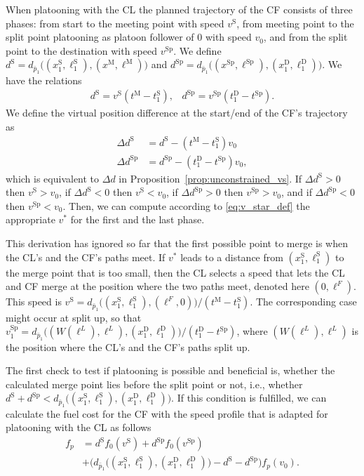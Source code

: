 \documentclass[letterpaper,10pt,conference,twocolumn]{IEEEtran}
\newcommand{\op}[1]{\mathrm{#1}}
\theoremstyle{definition}
\begin{document}
When platooning with the CL the planned trajectory of the CF consists of three phases: from start to the meeting point with speed $v^\op{S}$, from meeting point to the split point platooning as platoon follower of $0$ with speed $v_{0}$, and from the split point to the destination with speed $v^\op{Sp}$. We define $d^\op{S} = d_{\bar{p}_1}\big((x_1^\op{S},\ell_1^\op{S}),(x^\op{M},\ell^\op{M})\big)$ and $d^\op{Sp} = d_{\bar{p}_1}\big((x^\op{Sp},\ell^\op{Sp}),(x_1^\op{D},\ell_1^\op{D})\big)$. We have the relations
\begin{align*}
 d^\op{S} = v^\op{S}(t^\op{M} - t_1^\op{S}),\;\;\;
 d^\op{Sp} = v^\op{Sp}(t_1^\op{D} - t^\op{Sp}).
\end{align*}
We define the virtual position difference at the start/end of the CF's trajectory as
\begin{equation}
\begin{split}
 \Delta d^\op{S} &= d^\op{S} - (t^\op{M} - t_{1}^\op{S})v_{0}\\
 \Delta d^\op{Sp} &= d^\op{Sp} - (t_{1}^\op{D} - t^\op{Sp})v_{0}, \label{eq:delta_d_general}
\end{split}
\end{equation}
which is equivalent to $\Delta d$ in Proposition~\ref{prop:unconstrained_vs}. If $\Delta d^\op{S} > 0$ then $v^\op{S} > v_{0}$, if $\Delta d^\op{S} < 0$ then $v^\op{S} < v_{0}$, if $\Delta d^\op{Sp} > 0$ then $v^\op{Sp} > v_{0}$, and if $\Delta d^\op{Sp} < 0$ then $v^\op{Sp} < v_{0}$. Then, we can compute according to \eqref{eq:v_star_def} the appropriate $v^*$ for the first and the last phase. 

This derivation has ignored so far that the first possible point to merge is when the CL's and the CF's paths meet. If $v^*$ leads to a distance from $(x_1^\op{S},\ell_1^\op{S})$ to the merge point that is too small, then the CL selects a speed that lets the CL and CF merge at the position where the two paths meet, denoted here $(0,\ell^F)$. 
This speed is $v^\op{S} = d_{\bar{p}_1}\big((x_1^\op{S},\ell_{1}^\op{S}),(\ell^F,0)\big)/(t^\op{M} - t_{1}^\op{S})$. The corresponding case might occur at split up, so that $v_{1}^\op{Sp} = d_{\bar{p}_1}\big((W(\ell^L),\ell^L),(x_{1}^\op{D},\ell_{1}^\op{D})\big)/(t_{1}^\op{D} - t^\op{Sp})$, where $(W(\ell^L),\ell^L)$ is the position where the CL's and the CF's paths split up.

The first check to test if platooning is possible and beneficial is, whether the calculated merge point lies before the split point or not, i.e., whether
$
 d^\op{S} + d^\op{Sp} < d_{\bar{p}_1}\big((x_{1}^\op{S},\ell_{1}^\op{S}),(x_{1}^\op{D},\ell_{1}^\op{D})\big).
$
If this condition is fulfilled, we can calculate the fuel cost for the CF with the speed profile that is adapted for platooning with the CL as follows
\begin{equation}
\begin{split}
 f_{p} &= d^\op{S} f_0(v^\op{S}) + d^\op{Sp} f_0(v^\op{Sp})\\
 &+ \big(d_{\bar{p}_1}\big((x_1^\op{S},\ell_1^\op{S}),(x_1^\op{D},\ell_1^\op{D})\big) - d^\op{S} - d^\op{Sp}\big) f_p(v_{0}). \label{eq:adapted_fuel_consumption}
\end{split}
\end{equation}
\end{document}
